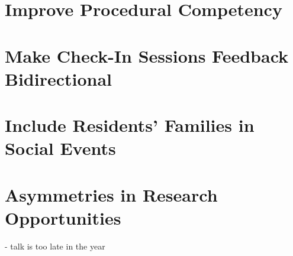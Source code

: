 \documentclass[]{article}
\begin{document}
	\section{Improve Procedural Competency}
	
	\section{Make Check-In Sessions Feedback Bidirectional}
	
	\section{Include Residents' Families in Social Events}
	
	\section{Asymmetries in Research Opportunities}
	- talk is too late in the year
\end{document}
